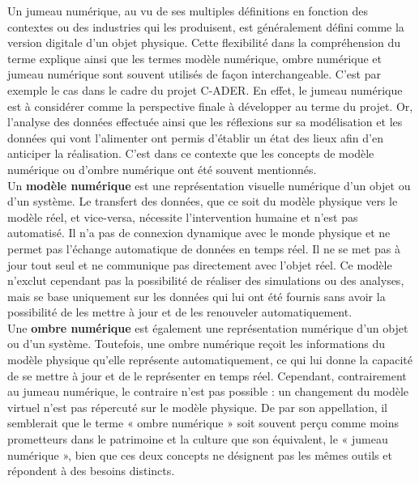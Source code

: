  Un jumeau numérique, au vu de ses multiples définitions en fonction des contextes ou des industries qui les produisent, est généralement défini comme la version digitale d’un objet physique. Cette flexibilité dans la compréhension du terme explique ainsi que les termes modèle numérique, ombre numérique et jumeau numérique sont souvent utilisés de façon interchangeable. C’est par exemple le cas dans le cadre du projet C-ADER. En effet, le jumeau numérique est à considérer comme la perspective finale à développer au terme du projet. Or, l’analyse des données effectuée ainsi que les réflexions sur sa modélisation et les données qui vont l'alimenter ont permis d’établir un état des lieux afin d’en anticiper la réalisation. C'est dans ce contexte que les concepts de modèle numérique ou d’ombre numérique ont été souvent mentionnés.\\

Un \textbf{modèle numérique} est une représentation visuelle numérique d'un objet ou d'un système. Le transfert des données, que ce soit du modèle physique vers le modèle réel, et vice-versa, nécessite l’intervention humaine et n'est pas automatisé. Il n'a pas de connexion dynamique avec le monde physique et ne permet pas l'échange automatique de données en temps réel. Il ne se met pas à jour tout seul et ne communique pas directement avec l'objet réel. Ce modèle n'exclut cependant pas la possibilité de réaliser des simulations ou des analyses, mais se base uniquement sur les données qui lui ont été fournis sans avoir la possibilité de les mettre à jour et de les renouveler automatiquement. \\ 

Une \textbf{ombre numérique} est également une représentation numérique d'un objet ou d'un système. Toutefois, une ombre numérique reçoit les informations du modèle physique qu'elle représente automatiquement, ce qui lui donne la capacité de se mettre à jour et de le représenter en temps réel. Cependant, contrairement au jumeau numérique, le contraire n'est pas possible : un changement du modèle virtuel n'est pas répercuté sur le modèle physique. De par son appellation, il semblerait que le terme « ombre numérique » soit souvent perçu comme moins prometteurs dans le patrimoine et la culture que son équivalent, le « jumeau numérique », bien que ces deux concepts ne désignent pas les mêmes outils et répondent à des besoins distincts. \\

